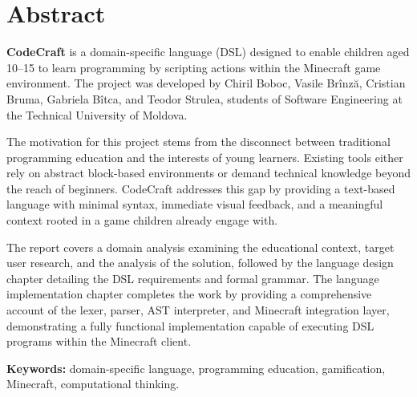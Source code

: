 \chapter*{Abstract}

\textbf{CodeCraft} is a domain-specific language (DSL) designed to enable children aged 10--15 
to learn programming by scripting actions within the Minecraft game environment. 
The project was developed by Chiril Boboc, Vasile Brînză, Cristian Bruma, Gabriela Bîtca, 
and Teodor Strulea, students of Software Engineering at the Technical University of Moldova.

The motivation for this project stems from the disconnect between traditional programming 
education and the interests of young learners. Existing tools either rely on abstract block-based 
environments or demand technical knowledge beyond the reach of beginners. CodeCraft addresses 
this gap by providing a text-based language with minimal syntax, immediate visual feedback, 
and a meaningful context rooted in a game children already engage with.

The report covers a domain analysis examining the educational context, target user research, 
and the analysis of the solution, followed by the language design chapter detailing the DSL requirements
and formal grammar. The language implementation chapter completes the work by providing a comprehensive
account of the lexer, parser, AST interpreter, and Minecraft integration layer, demonstrating a fully
functional implementation capable of executing DSL programs within the Minecraft client.

\textbf{Keywords: } domain-specific language, programming education, gamification, Minecraft, 
computational thinking.
